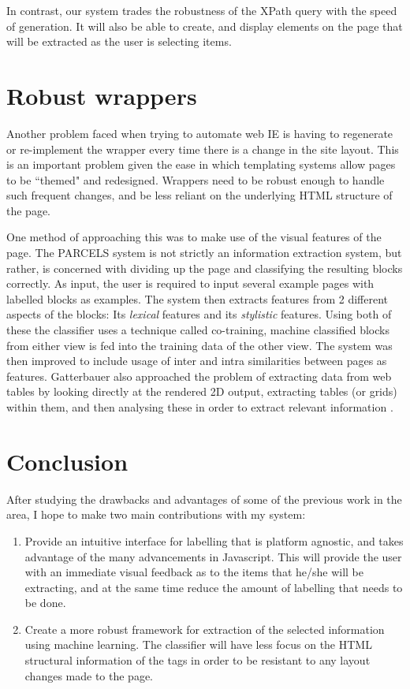 In contrast, our system trades the robustness of the XPath
query with the speed of generation. It will also be able to create, and display
elements on the page that will be extracted as the user is selecting items.

\section{Robust wrappers}
Another problem faced when trying to automate web IE is having to regenerate or re-implement
the wrapper every time there is a change in the site layout. This is an important problem given
the ease in which templating systems allow pages to be ``themed" and redesigned. Wrappers need
to be robust enough to handle such frequent changes, and be less reliant on the underlying HTML
structure of the page.
	
One method of approaching this was to make use of the visual features of the page. The PARCELS \cite{Lee2004}
system is not strictly an information extraction system, but rather, is concerned with dividing
up the page and classifying the resulting blocks correctly. As input, the user is required to
input several example pages with labelled blocks as examples. The system then extracts features
from 2 different aspects of the blocks: Its \textit{lexical} features and its
\textit{stylistic} features. Using both of these the classifier uses a technique called
co-training, machine classified blocks from either view is fed into the training data of the
other view. The system was then improved to include usage of inter and intra
similarities between pages as features\cite{AikMiang2005}. Gatterbauer also approached the
problem of extracting data from web tables by looking directly at the rendered 2D output,
extracting tables (or grids) within them, and then analysing these in order to extract relevant
information \cite{Gatterbauer2007}.

\section{Conclusion}


After studying the drawbacks and advantages of some of the previous work in the area, I hope to
make two main contributions with my system:
\begin{enumerate}
	\item Provide an intuitive interface for labelling that is platform agnostic, and takes advantage of the many advancements in Javascript. This will provide the user with an immediate visual feedback as to the items that he/she will be extracting, and at the same time reduce the amount of labelling that needs to be done.
	\item Create a more robust framework for extraction of the selected information using machine learning. The classifier will have less focus on the HTML structural information of the tags in order to be resistant to any layout changes made to the page.
\end{enumerate}

